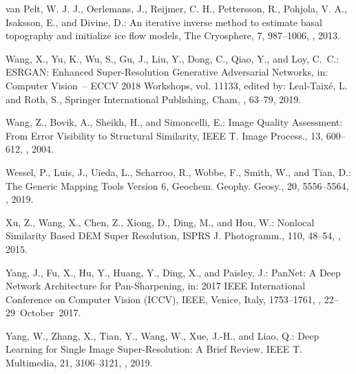 \documentclass[tc, noline]{copernicus}
\begin{document}
\begin{thebibliography}{95}
van Pelt, W. J. J., Oerlemans, J., Reijmer, C. H., Pettersson, R., Pohjola, V. A., Isaksson, E., and Divine, D.: An iterative inverse method to estimate basal topography and initialize ice flow models, The Cryosphere, 7, 987--1006, , 2013.


Wang, X., Yu, K., Wu, S., Gu, J., Liu, Y., Dong, C., Qiao, Y., and Loy, C.~C.:
ESRGAN: Enhanced Super-Resolution Generative Adversarial Networks,
in: Computer Vision~-- ECCV 2018 Workshops, vol. 11133,
edited by: Leal-Taix{\'e}, L. and Roth, S.,
Springer International Publishing, {Cham}, , 63--79, 2019.

Wang, Z., Bovik, A., Sheikh, H., and Simoncelli, E.:
Image Quality Assessment: From Error Visibility to Structural Similarity,
IEEE T. Image Process.,
13, 600--612, , 2004.

\hack{\newpage}

Wessel, P., Luis, J., Uieda, L., Scharroo, R., Wobbe, F., Smith, W., and Tian, D.:
The Generic Mapping Tools Version 6,
Geochem. Geophy. Geosy.,
20, 5556--5564, , 2019.


Xu, Z., Wang, X., Chen, Z., Xiong, D., Ding, M., and Hou, W.:
Nonlocal Similarity Based DEM Super Resolution,
ISPRS J. Photogramm.,
110, 48--54, , 2015.


Yang, J., Fu, X., Hu, Y., Huang, Y., Ding, X., and Paisley, J.: PanNet: A Deep Network Architecture for Pan-Sharpening, in: 2017 IEEE International Conference on Computer Vision (ICCV), IEEE, Venice, Italy, 1753--1761, , 22--29~October~2017.

Yang, W., Zhang, X., Tian, Y., Wang, W., Xue, J.-H., and Liao, Q.:
Deep Learning for Single Image Super-Resolution: A Brief Review,
IEEE T. Multimedia,
21, 3106--3121, , 2019.

\end{thebibliography}
\end{document}
